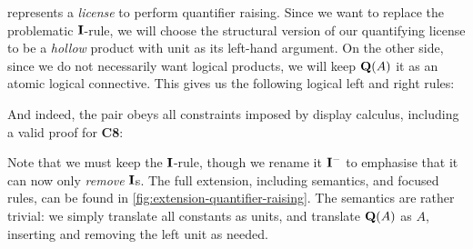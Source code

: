 represents a \emph{license} to perform quantifier raising. Since we
want to replace the problematic $\I$-rule, we will choose the
structural version of our quantifying license to be a \emph{hollow}
product with unit as its left-hand argument.
On the other side, since we do not necessarily want logical products,
we will keep $\q[A]$ it as an atomic logical connective. This gives us
the following logical left and right rules:
\begin{center}
  \begin{pfbox}
  \end{pfbox}
  \begin{pfbox}
  \end{pfbox}
\end{center}
And indeed, the pair obeys all constraints imposed by display
calculus, including a valid proof for \textbf{C8}:
\vspace*{-1\baselineskip}
\begin{pfblock}
\end{pfblock}
Note that we must keep the $\I$-rule, though we rename it $\I^-$ to
emphasise that it can now only \emph{remove} $\I$s. The full
extension, including semantics, and focused rules, can be found in
\autoref{fig:extension-quantifier-raising}. The semantics are rather
trivial: we simply translate all constants as units, and translate
$\q[A]$ as $A$, inserting and removing the left unit as needed.



